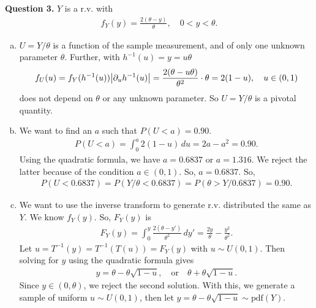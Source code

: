 \documentclass[11pt]{article}
\begin{document}
\noindent \textbf{Question 3.}
$Y$ is a r.v. with 
\begin{align*}
f_Y(y)= \frac{2(\theta-y)}{\theta}, \quad 0 < y < \theta.
\end{align*}
\begin{enumerate}[(a)]
	\item $U = Y/\theta$ is a function of the sample measurement, and of only one unknown parameter $\theta$. Further, with $h^{-1}(u) = y = u\theta$
	\begin{align*}
	f_U(u) = f_Y(h^{-1}(u))\abs{\partial_u h^{-1}(u)} = \frac{2(\theta-u\theta)}{\theta^2}\cdot \theta = 2(1-u), \quad u \in (0,1)
	\end{align*}
	does not depend on $\theta$ or any unknown parameter. So $U = Y/\theta$ is a pivotal quantity. 
	
	\item We want to find an $a$ such that $P(U < a) = 0.90$. 
	\begin{align*}
	P(U < a) = \int_0^a 2(1-u)\,du = 2a - a^2 = 0.90.
	\end{align*}
	Using the quadratic formula, we have $a = 0.6837$ or $a = 1.316$. We reject the latter because of the condition $a \in (0,1)$. So, $a = 0.6837$. So,
	\begin{align*}
	P(U < 0.6837) = P(Y/\theta < 0.6837) = P(\theta> Y/0.6837) = 0.90. 
	\end{align*}
	
	
	
	\item We want to use the inverse transform to generate r.v. distributed the same as $Y$. We know $f_Y(y)$. So, $F_Y(y)$ is 
	\begin{align*}
	F_Y(y) = \int^y_0 \frac{2(\theta-y')}{\theta^2}\,dy' = \frac{2y}{\theta} - \frac{y^2}{\theta^2}.
	\end{align*}
	Let $u=T^{-1}(y) = T^{-1}(T(u)) = F_Y(y)$ with $u \sim U(0,1)$. Then solving for $y$ using the quadratic formula gives
	\begin{align*}
	y = \theta - \theta\sqrt{1-u}, \quad \text{or} \quad \theta + \theta\sqrt{1-u}.
	\end{align*}
	Since $y \in (0,\theta)$, we reject the second solution. With this, we generate a sample of uniform $u\sim U(0,1)$, then let $y = \theta - \theta\sqrt{1-u} \sim \text{pdf}(Y)$. 
	
\end{enumerate}


\newpage
\end{document}
